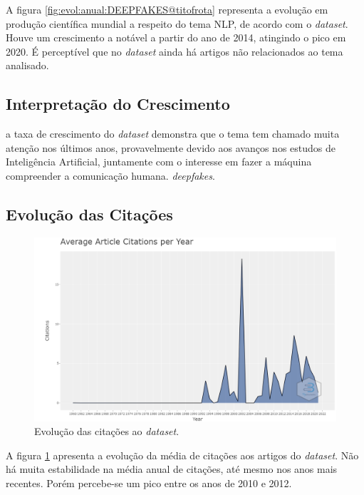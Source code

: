 A figura \ref{fig:evol:anual:DEEPFAKES@titofrota} representa a evolução em produção científica mundial a respeito do tema NLP, de acordo com o \textit{dataset}. Houve um crescimento a notável a partir do ano de 2014, atingindo o pico em 2020. 
É perceptível que no \textit{dataset} ainda há artigos não relacionados ao tema analisado.

\subsection{Interpretação do Crescimento} a taxa de crescimento do \textit{dataset} demonstra que o tema tem chamado muita atenção nos últimos anos, provavelmente devido aos avanços nos estudos de Inteligência Artificial, juntamente com o interesse em fazer a máquina compreender a comunicação humana. \textit{deepfakes}.

\subsection{Evolução das Citações}

\begin{figure}
    \centering
    \includegraphics[angle=0,width=1\textwidth]{experiments/titofrota/PesquisaBibliometrica/Deepfakes/citations-year-plot.png}
    \caption{Evolução das citações ao \textit{dataset}.}
    \label{fig:evol:anual:citacoes:DEEPFAKES@titofrota}
\end{figure}

A figura \ref{fig:evol:anual:citacoes:DEEPFAKES@titofrota} apresenta a evolução da média de citações aos artigos do \textit{dataset}. Não há muita estabilidade na média anual de citações, até mesmo nos anos mais recentes. Porém percebe-se um pico entre os anos de 2010 e 2012.

